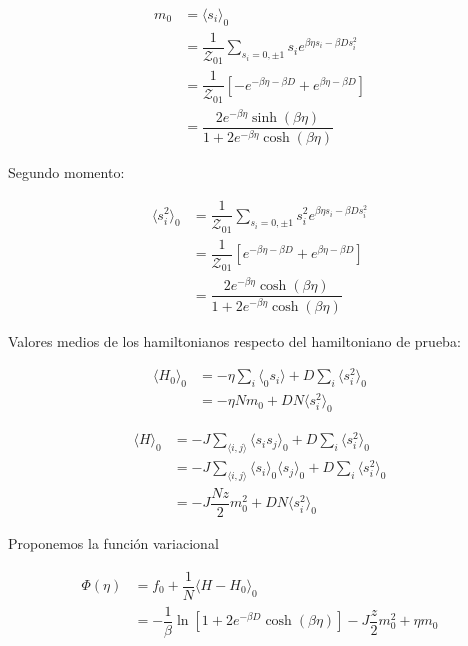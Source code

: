 \documentclass[10pt]{article}
\begin{document}
\begin{align} \label{eq:BC_m0}
m_0 &= \langle s_i \rangle_0 \nonumber \\
&= \dfrac{1}{\mathcal{Z}_{01}} \sum_{s_i=0,\pm1} s_i e^{\beta \eta s_i - \beta D  s_i^2} \nonumber \\
&= \dfrac{1}{\mathcal{Z}_{01}} \left[-e^{-\beta \eta -\beta D} + e^{\beta \eta -\beta D} \right] \nonumber \\
&= \dfrac{2e^{-\beta \eta}\sinh\left( \beta \eta \right)}{1+2e^{-\beta \eta}\cosh\left( \beta \eta \right)}
\end{align}

Segundo momento:

\begin{align}
\langle s_i^2 \rangle_0 &= \dfrac{1}{\mathcal{Z}_{01}} \sum_{s_i=0,\pm1} s_i^2 e^{\beta \eta s_i - \beta D  s_i^2} \nonumber \\
&= \dfrac{1}{\mathcal{Z}_{01}} \left[e^{-\beta \eta -\beta D} + e^{\beta \eta -\beta D} \right] \nonumber \\
&= \dfrac{2e^{-\beta \eta}\cosh\left( \beta \eta \right)}{1+2e^{-\beta \eta}\cosh\left( \beta \eta \right)}
\end{align}

Valores medios de los hamiltonianos respecto del hamiltoniano de prueba:

\begin{align}
\langle H_0 \rangle_0 &= -\eta \sum_i \langle_0 s_i \rangle + D \sum_i \langle s_i^2 \rangle_0 \nonumber \\
&= -\eta N m_0 + D N \langle s_i^2 \rangle_0 \nonumber
\end{align}

\begin{align}
\langle H \rangle_0 &= -J \sum_{\langle i,j\rangle} \langle s_i s_j \rangle_0 + D \sum_i \langle s_i^2 \rangle_0 \nonumber \\
&= -J \sum_{\langle i,j\rangle} \langle s_i \rangle_0 \langle s_j \rangle_0 + D \sum_i \langle s_i^2 \rangle_0 \nonumber \\
&= -J \dfrac{Nz}{2} m_0^2 + D N \langle s_i^2 \rangle_0 \nonumber
\end{align}

Proponemos la funci\'on variacional 

\begin{align} \label{eq:BC_Phi}
\Phi(\eta) &= f_0 + \dfrac{1}{N} \langle H - H_0 \rangle_0 \nonumber \\
&= -\dfrac{1}{\beta} \ln \left[ 1 + 2e^{-\beta D} \cosh\left(\beta \eta\right) \right] - J \dfrac{z}{2} m_0^2 + \eta m_0
\end{align}
\end{document}
